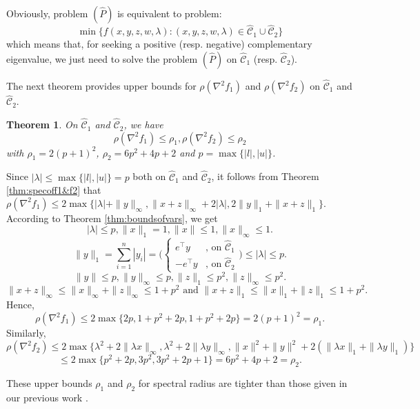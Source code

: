 \documentclass[3p]{elsarticle}
\newtheorem{thm}{Theorem}
\begin{document}
Obviously, problem $(\hat{P})$ is equivalent to problem:
\begin{equation}
\min \{f(x,y,z,w,\lambda) : (x,y,z,w,\lambda) \in \mathcal{\hat{C}}_1 \cup \mathcal{\hat{C}}_2 \}
\end{equation}
which means that, for seeking a positive (resp. negative) complementary eigenvalue, we just need to solve the problem $(\hat{P})$ on $\hat{\mathcal{C}}_1$ (resp. $\hat{\mathcal{C}}_2$).

The next theorem provides upper bounds for $\rho (\nabla^2 f_1)$ and $\rho (\nabla^2 f_2)$ on $\mathcal{\hat{C}}_1$ and $\mathcal{\hat{C}}_2$.

\begin{thm}\label{thm:boundsofspectralradius} On $\mathcal{\hat{C}}_1$ and $\mathcal{\hat{C}}_2$, we have
	\[\rho (\nabla^2 f_1) \leq \rho_1, \rho (\nabla^2 f_2) \leq \rho_2\]
	with $\rho_1= 2(p+1)^2$, $\rho_2 = 6p^2+4p+2$ and $p=\max\{|l|,|u|\}$. 
\end{thm}
\begin{pf}
	Since $|\lambda| \leq  \max\{|l|,|u|\}=p$ both on $\mathcal{\hat{C}}_1$ and $\mathcal{\hat{C}}_2$, it follows from Theorem \ref{thm:specoff1&f2} that
	$\rho (\nabla^2 f_1) \leq  2 \max\{|\lambda| + \|y\|_{\infty}, \|x+z\|_{\infty}+2|\lambda|, 2\|y\|_1 + \|x+z\|_{1}\}.$
	According to Theorem \ref{thm:boundsofvars}, we get
	\[|\lambda|\leq p, \|x\|_1 =1, \|x\|\leq 1, \|x\|_{\infty}\leq 1.\]
	\[\|y\|_1 =\sum_{i=1}^{n}|y_i| = \biggl(\begin{cases}
	e^{\top}y & \text{, on } \mathcal{\hat{C}}_1\\
	-e^{\top}y & \text{, on } \mathcal{\hat{C}}_2
	\end{cases}\biggr) \leq |\lambda| \leq p. \]
	\[\|y\| \leq p, \|y\|_{\infty}\leq p, \|z\|_1\leq p^2, \|z\|_{\infty}\leq p^2.\]
	\[\|x+z\|_{\infty} \leq \|x\|_{\infty} + \|z\|_{\infty} \leq 1 + p^2 \text{ and } \|x+z\|_{1} \leq \|x\|_{1} + \|z\|_{1} \leq 1 + p^2.\]	
	Hence,
	\[\rho (\nabla^2 f_1)\leq 2\max\{2p,1+p^2+2p,1+p^2+2p\}= 2(p+1)^2=\rho_1.\]
	Similarly, 
	\[\rho (\nabla^2 f_2) \leq 2 \max\{\lambda^2+2\|\lambda x\|_{\infty}, \lambda^2+2\|\lambda y\|_{\infty}, \|x\|^2+\|y\|^2 + 2(\|\lambda x\|_1 + \|\lambda y\|_1) \} \]
	\[\leq 2\max\{p^2+2p, 3p^2, 3p^2+2p+1\} =6p^2+4p+2=\rho_2.\]
\end{pf}
\begin{rmk}
	These upper bounds $\rho_1$ and $\rho_2$ for spectral radius are tighter than those given in our previous work \cite{Niu15}.
\end{rmk}
\end{document}
